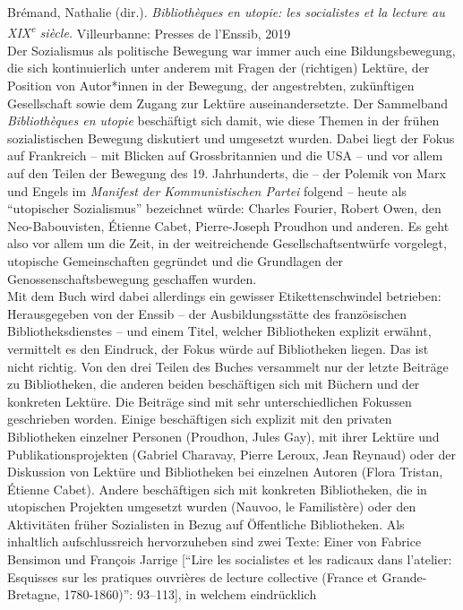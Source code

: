 \documentclass[a4paper,
fontsize=11pt,
oneside,
numbers=noperiodatend,
parskip=half-,
bibliography=totoc,
final
]{scrartcl}
\begin{document}
Brémand, Nathalie (dir.). \emph{Bibliothèques en utopie: les socialistes
et la lecture au XIX\textsuperscript{e} siècle.} Villeurbanne: Presses
de l'Enssib, 2019\\
Der Sozialismus als politische Bewegung war immer auch eine
Bildungsbewegung, die sich kontinuierlich unter anderem mit Fragen der
(richtigen) Lektüre, der Position von Autor*innen in der Bewegung, der
angestrebten, zukünftigen Gesellschaft sowie dem Zugang zur Lektüre
auseinandersetzte. Der Sammelband \emph{Bibliothèques en utopie}
beschäftigt sich damit, wie diese Themen in der frühen sozialistischen
Bewegung diskutiert und umgesetzt wurden. Dabei liegt der Fokus auf
Frankreich -- mit Blicken auf Grossbritannien und die USA -- und vor
allem auf den Teilen der Bewegung des 19. Jahrhunderts, die -- der
Polemik von Marx und Engels im \emph{Manifest der Kommunistischen
Partei} folgend -- heute als ``utopischer Sozialismus'' bezeichnet
würde: Charles Fourier, Robert Owen, den Neo-Babouvisten, Étienne Cabet,
Pierre-Joseph Proudhon und anderen. Es geht also vor allem um die Zeit,
in der weitreichende Gesellschaftsentwürfe vorgelegt, utopische
Gemeinschaften gegründet und die Grundlagen der Genossenschaftsbewegung
geschaffen wurden.\\
Mit dem Buch wird dabei allerdings ein gewisser Etikettenschwindel
betrieben: Herausgegeben von der Enssib -- der Ausbildungsstätte des
französischen Bibliotheksdienstes -- und einem Titel, welcher
Bibliotheken explizit erwähnt, vermittelt es den Eindruck, der Fokus
würde auf Bibliotheken liegen. Das ist nicht richtig. Von den drei
Teilen des Buches versammelt nur der letzte Beiträge zu Bibliotheken,
die anderen beiden beschäftigen sich mit Büchern und der konkreten
Lektüre. Die Beiträge sind mit sehr unterschiedlichen Fokussen
geschrieben worden. Einige beschäftigen sich explizit mit den privaten
Bibliotheken einzelner Personen (Proudhon, Jules Gay), mit ihrer Lektüre
und Publikationsprojekten (Gabriel Charavay, Pierre Leroux, Jean
Reynaud) oder der Diskussion von Lektüre und Bibliotheken bei einzelnen
Autoren (Flora Tristan, Étienne Cabet). Andere beschäftigen sich mit
konkreten Bibliotheken, die in utopischen Projekten umgesetzt wurden
(Nauvoo, le Familistère) oder den Aktivitäten früher Sozialisten in
Bezug auf Öffentliche Bibliotheken. Als inhaltlich aufschlussreich
hervorzuheben sind zwei Texte: Einer von Fabrice Bensimon und François
Jarrige {[}``Lire les socialistes et les radicaux dans l'atelier:
Esquisses sur les pratiques ouvrières de lecture collective (France et
Grande-Bretagne, 1780-1860)'': 93--113{]}, in welchem eindrücklich
\end{document}
